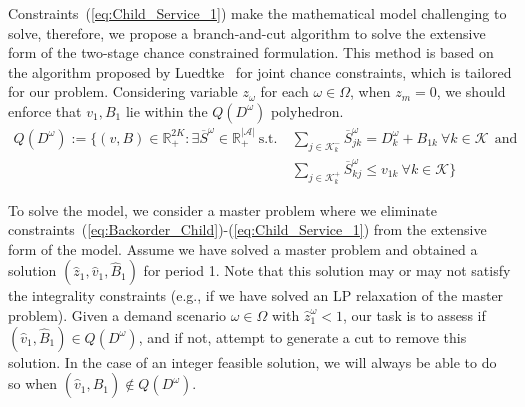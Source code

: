 \documentclass[10pt]{article}
\newcommand{\ka}{k} %
\newcommand{\KA}{\mathcal{K}}
\newcommand{\Ka}{K}
\newcommand{\jey}{j} %
\newcommand{\Graf}{\mathcal{A}} %
\newcommand{\Bi}{B} %
\newcommand{\Vi}{v} %
\newcommand{\Zed}{z} %
\newcommand{\m}{\omega} %
\newcommand{\EM}{\Omega} %
\newcommand{\Csub}{\mathcal{K}^+_k}
\newcommand{\Psub}{\mathcal{K}^-_k}
\newcommand{\Sc}{\overline{S}}
\begin{document}
Constraints~(\ref{eq:Child_Service_1}) make the mathematical model challenging to solve, therefore, we propose a branch-and-cut algorithm to solve the extensive form of the two-stage chance constrained  formulation. This method is based on the algorithm proposed by Luedtke~\cite{luedtke2014branch} for joint chance constraints, which is tailored for our problem. 
 Considering variable $\Zed_\m$ for each $\m \in \EM$, when $\Zed_m=0$, we should enforce that $\Vi_{1}, \Bi_{1}$ lie within the $Q(D^{\m})$ polyhedron.
\begin{align*} Q(D^\m) := \{ (\Vi,\Bi) \in \mathbb{R}_+^{2\Ka} :  \exists \Sc^\m \in \mathbb{R}_+^{|\Graf|}  \ \text{s.t.} \ 
 & \sum_{\jey \in  \Psub} \Sc^\m_{\jey \ka } = D^ {\m}_{\ka} + \Bi_{1\ka} \ \forall \ka  \in \KA \ \ \text{and} \\
 & \sum_{\jey \in  \Csub} \Sc^\m_{\ka \jey} \leq \Vi_{1\ka} \ \forall \ka  \in \KA \}
 \end{align*}
 
\newcommand{\vsol}{\hat{\Vi}}
\newcommand{\zsol}{\hat{\Zed}}
\newcommand{\bsol}{\hat{\Bi}}
\newcommand{\pisol}{\hat{\pi}}
\newcommand{\betasol}{\hat{\beta}}

To solve the model, we consider a  master problem where we eliminate constraints~(\ref{eq:Backorder_Child})-(\ref{eq:Child_Service_1}) from the extensive form of the model. Assume we have solved a master problem and obtained a solution $(\zsol_1,\vsol_1,\bsol_1)$ for period 1. Note that this solution may or may not satisfy the integrality constraints (e.g., if we have solved an LP relaxation of the master problem). Given a demand scenario $\m \in \EM$ with $\zsol_1^\m < 1$, our task is to assess if $(\vsol_1,\bsol_1) \in Q(D^\m)$, and if not, attempt to generate a cut to remove this solution. In the case of an integer feasible solution, we will always be able to do so when $(\vsol_1,\bsol_1) \notin Q(D^\m)$.
\end{document}

